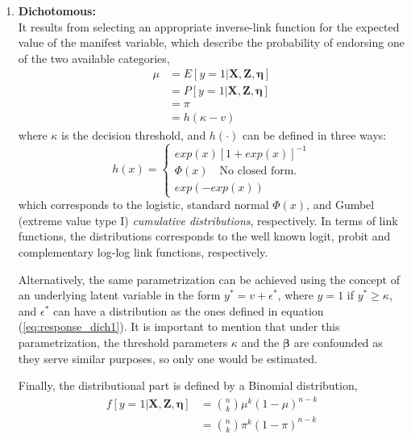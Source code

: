 \begin{enumerate}
	\item \textbf{Dichotomous:} \\
	It results from selecting an appropriate inverse-link function for the expected value of the manifest variable, which describe the probability of endorsing one of the two available categories,
	\begin{equation} \label{eq:link_dich}
		\begin{split}
		\mu &= E[y=1 | \mathbf{X}, \mathbf{Z}, \pmb{\eta}] \\ 
		&= P[y=1 | \mathbf{X}, \mathbf{Z}, \pmb{\eta}] \\
		&= \pi \\
		&= h(\kappa - v)
		\end{split}	
	\end{equation}
	where $\kappa$ is the decision threshold, and $h(\cdot)$ can be defined in three ways:	
	\begin{equation} \label{eq:response_dich1}
		h(x) = 
		\begin{cases}
			exp(x)[1 + exp(x)]^{-1} \\
			\Phi(x) \quad \text{No closed form.} \\
			exp(-exp(x))
		\end{cases}
	\end{equation}
	which corresponds to the logistic, standard normal $\Phi(x)$, and Gumbel (extreme value type I) \textit{cumulative distributions}, respectively. In terms of link functions, the distributions corresponds to the well known logit, probit and complementary log-log link functions, respectively. 
	
	Alternatively, the same parametrization can be achieved using the concept of an underlying latent variable in the form $y^{*} = v + \epsilon^{*}$, where $y = 1$ if $y^{*} \ge \kappa$, and $\epsilon^{*}$ can have a distribution as the ones defined in equation (\ref{eq:response_dich1}). It is important to mention that under this parametrization, the threshold parameters $\kappa$ and the $\pmb{\beta}$ {\color{red} are confounded as they serve similar purposes, so only one would be estimated}.
	
	Finally, the distributional part is defined by a Binomial distribution,
	\begin{equation} \label{eq:dist_dich}
		\begin{split}
		f[y=1 | \mathbf{X}, \mathbf{Z}, \pmb{\eta}] &= \binom{n}{k} \mu^{k} (1-\mu)^{n-k} \\
		&= \binom{n}{k} \pi^{k} (1-\pi)^{n-k}
		\end{split}
	\end{equation}


\end{enumerate}
